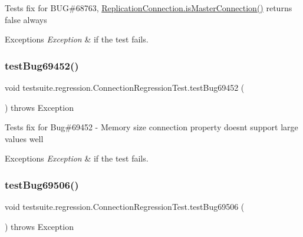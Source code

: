 Tests fix for B\+UG\#68763, \mbox{\hyperlink{interfacecom_1_1mysql_1_1cj_1_1jdbc_1_1_jdbc_connection_a012dc133872dd4d6db6d6f98118d3251}{Replication\+Connection.\+is\+Master\+Connection()}} returns false always


\begin{DoxyExceptions}{Exceptions}
{\em Exception} & if the test fails. \\
\hline
\end{DoxyExceptions}
\mbox{\label{classtestsuite_1_1regression_1_1_connection_regression_test_a83cf8c588a6543301dab7d3afa57042b}} 
\subsubsection{\texorpdfstring{test\+Bug69452()}{testBug69452()}}
{\footnotesize\ttfamily void testsuite.\+regression.\+Connection\+Regression\+Test.\+test\+Bug69452 (\begin{DoxyParamCaption}{ }\end{DoxyParamCaption}) throws Exception}

Tests fix for Bug\#69452 -\/ Memory size connection property doesn\textquotesingle{}t support large values well


\begin{DoxyExceptions}{Exceptions}
{\em Exception} & if the test fails. \\
\hline
\end{DoxyExceptions}
\mbox{\label{classtestsuite_1_1regression_1_1_connection_regression_test_ac8bd9a129a96fb8c9d9c220369e1a5b2}} 
\subsubsection{\texorpdfstring{test\+Bug69506()}{testBug69506()}}
{\footnotesize\ttfamily void testsuite.\+regression.\+Connection\+Regression\+Test.\+test\+Bug69506 (\begin{DoxyParamCaption}{ }\end{DoxyParamCaption}) throws Exception}

